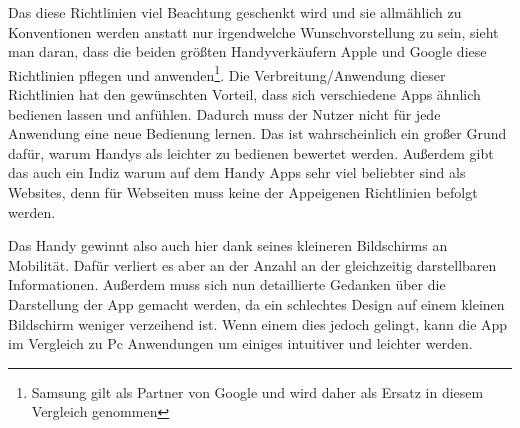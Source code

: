 Das diese Richtlinien viel Beachtung geschenkt wird und sie allmählich zu Konventionen werden anstatt nur irgendwelche Wunschvorstellung zu sein, sieht man daran, dass die beiden größten Handyverkäufern Apple und Google diese Richtlinien pflegen und anwenden\cite{pcVsphone_vendors}\footnote{Samsung gilt als Partner von Google und wird daher als Ersatz in diesem Vergleich genommen\myTodo {}}. Die Verbreitung/Anwendung dieser Richtlinien hat den gewünschten Vorteil, dass sich verschiedene Apps ähnlich bedienen lassen und anfühlen. Dadurch muss der Nutzer nicht für jede Anwendung eine neue Bedienung lernen. Das ist wahrscheinlich ein großer Grund dafür, warum Handys als leichter zu bedienen bewertet werden\cite{pcVsphone_easyUseVsImportantTask}. Außerdem gibt das auch ein Indiz warum auf dem Handy Apps sehr viel beliebter sind als Websites\cite{pcVsphone_mobileAppVsWebTimeSpent}, denn für Webseiten muss keine der Appeigenen Richtlinien befolgt werden.\newline%

Das Handy gewinnt also auch hier dank seines kleineren Bildschirms an Mobilität. Dafür verliert es aber an der Anzahl an der gleichzeitig darstellbaren Informationen. Außerdem muss sich nun detaillierte Gedanken über die Darstellung der App gemacht werden, da ein schlechtes Design auf einem kleinen Bildschirm weniger verzeihend ist. Wenn einem dies jedoch gelingt, kann die App im Vergleich zu Pc Anwendungen um einiges intuitiver und leichter werden.

 
		
\myNewSection
{}
\newline
{}
\newline
{}